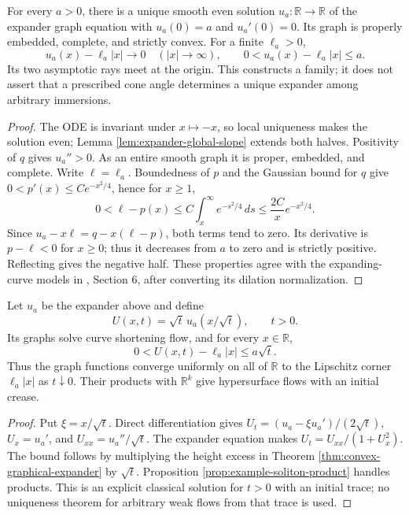 \begin{theorem}\label{thm:convex-graphical-expander}
For every $a>0$, there is a unique smooth even solution $u_a:\mathbb R\to\mathbb R$ of the expander graph equation with $u_a(0)=a$ and $u_a'(0)=0$. Its graph is properly embedded, complete, and strictly convex. For a finite $\ell_a>0$,
\[
 u_a(x)-\ell_a|x|\longrightarrow0\quad(|x|\to\infty),
 \qquad 0<u_a(x)-\ell_a|x|\leq a.
\]
Its two asymptotic rays meet at the origin. This constructs a family; it does not assert that a prescribed cone angle determines a unique expander among arbitrary immersions.
\end{theorem}
\begin{proof}
The ODE is invariant under $x\mapsto-x$, so local uniqueness makes the solution even; Lemma \ref{lem:expander-global-slope} extends both halves. Positivity of $q$ gives $u_a''>0$. As an entire smooth graph it is proper, embedded, and complete. Write $\ell=\ell_a$. Boundedness of $p$ and the Gaussian bound for $q$ give $0<p'(x)\leq Ce^{-x^2/4}$, hence for $x\geq1$,
\[
 0<\ell-p(x)\leq C\int_x^\infty e^{-s^2/4}\,ds
 \leq\frac{2C}{x}e^{-x^2/4}.
\]
Since $u_a-x\ell=q-x(\ell-p)$, both terms tend to zero. Its derivative is $p-\ell<0$ for $x\geq0$; thus it decreases from $a$ to zero and is strictly positive. Reflecting gives the negative half. These properties agree with the expanding-curve models in \cite{Hal12}, Section 6, after converting its dilation normalization.
\end{proof}

\begin{proposition}\label{prop:expander-corner-initial-trace}
Let $u_a$ be the expander above and define
\[
 U(x,t)=\sqrt t\,u_a(x/\sqrt t),\qquad t>0.
\]
Its graphs solve curve shortening flow, and for every $x\in\mathbb R$,
\[
 0<U(x,t)-\ell_a|x|\leq a\sqrt t.
\]
Thus the graph functions converge uniformly on all of $\mathbb R$ to the Lipschitz corner $\ell_a|x|$ as $t\downarrow0$. Their products with $\mathbb R^k$ give hypersurface flows with an initial crease.
\end{proposition}
\begin{proof}
Put $\xi=x/\sqrt t$. Direct differentiation gives $U_t=(u_a-\xi u_a')/(2\sqrt t)$, $U_x=u_a'$, and $U_{xx}=u_a''/\sqrt t$. The expander equation makes $U_t=U_{xx}/(1+U_x^2)$. The bound follows by multiplying the height excess in Theorem \ref{thm:convex-graphical-expander} by $\sqrt t$. Proposition \ref{prop:example-soliton-product} handles products. This is an explicit classical solution for $t>0$ with an initial trace; no uniqueness theorem for arbitrary weak flows from that trace is used.
\end{proof}

